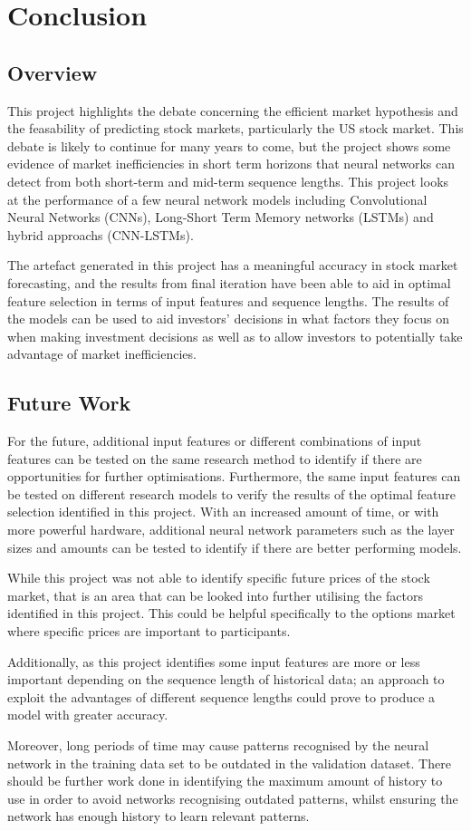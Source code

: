 \chapter{Conclusion} \label{chap:conclusion}
\section{Overview}
This project highlights the debate concerning the efficient market hypothesis and the feasability
of predicting stock markets, particularly the US stock market. This debate is likely to continue 
for many years to come, but the project shows some evidence of market inefficiencies in short term
horizons that neural networks can detect from both short-term and mid-term sequence lengths.
This project looks at the performance of a few neural network models including Convolutional Neural
Networks (CNNs), Long-Short Term Memory networks (LSTMs) and hybrid approachs (CNN-LSTMs).

The artefact generated in this project has a meaningful accuracy in stock market forecasting,
and the results from final iteration have been able to aid in optimal feature selection in terms
of input features and sequence lengths. The results of the models can be used to aid investors'
decisions in what factors they focus on when making investment decisions as well as to allow
investors to potentially take advantage of market inefficiencies.

\section{Future Work}
For the future, additional input features or different combinations of input features can be tested
on the same research method to identify if there are opportunities for further optimisations.
Furthermore, the same input features can be tested on different research models to verify the results
of the optimal feature selection identified in this project. With an increased amount of time, or with
more powerful hardware, additional neural network parameters such as the layer sizes and amounts can be
tested to identify if there are better performing models.

While this project was not able to identify specific future prices of the stock market, that is an
area that can be looked into further utilising the factors identified in this project. This could be
helpful specifically to the options market where specific prices are important to participants.

Additionally, as this project identifies some input features are more or less important depending on
the sequence length of historical data; an approach to exploit the advantages of different
sequence lengths could prove to produce a model with greater accuracy.

Moreover, long periods of time may cause patterns recognised by the neural network in the training data
set to be outdated in the validation dataset. There should be further work done in identifying the maximum
amount of history to use in order to avoid networks recognising outdated patterns, whilst ensuring the
network has enough history to learn relevant patterns.

